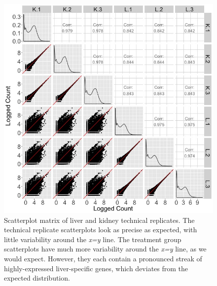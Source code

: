 \documentclass{article}
\begin{document}
\clearpage
\null
\begin{figure}[t!]
\centerline{\includegraphics[width=1\columnwidth]{../Bioinformatics/Pictures/liverKidney/DEG-raw/K_L_SM.jpg}}
\caption{Scatterplot matrix of liver and kidney technical replicates. The technical replicate scatterplots look as precise as expected, with little variability around the \textit{x=y} line. The treatment group scatterplots have much more variability around the \textit{x=y} line, as we would expect. However, they each contain a pronounced streak of highly-expressed liver-specific genes, which deviates from the expected distribution. 
\label{KLSM}}
\end{figure} 
\end{document}
